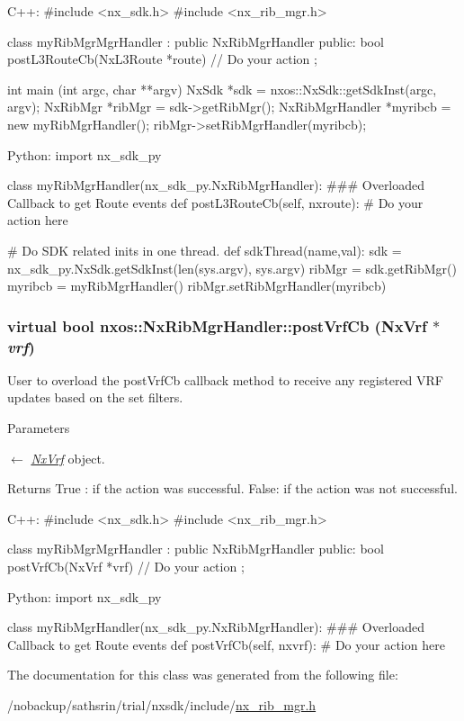 \begin{DoxyCode}
  C++:
     #include <nx_sdk.h>
     #include <nx_rib_mgr.h>

     class myRibMgrMgrHandler : public NxRibMgrHandler {
        public:
           bool postL3RouteCb(NxL3Route *route) {
                // Do your action
           }
     };

     int  main (int argc, char **argv)
     {
          NxSdk    *sdk = nxos::NxSdk::getSdkInst(argc, argv);
          NxRibMgr *ribMgr = sdk->getRibMgr();
          NxRibMgrHandler *myribcb = new myRibMgrHandler();
          ribMgr->setRibMgrHandler(myribcb);
     }

  Python:
     import nx_sdk_py

     class myRibMgrHandler(nx_sdk_py.NxRibMgrHandler):
     ### Overloaded Callback to get Route events
           def postL3RouteCb(self, nxroute):
               # Do your action here

     # Do SDK related inits in one thread.
     def sdkThread(name,val):
         sdk = nx_sdk_py.NxSdk.getSdkInst(len(sys.argv), sys.argv)
         ribMgr = sdk.getRibMgr()
         myribcb = myRibMgrHandler()
         ribMgr.setRibMgrHandler(myribcb)
\end{DoxyCode}
 \hypertarget{classnxos_1_1NxRibMgrHandler_a2ed5a3ad9c0e55d21e18d88a19419a5e}{
\subsubsection[{postVrfCb}]{\setlength{\rightskip}{0pt plus 5cm}virtual bool nxos::NxRibMgrHandler::postVrfCb ({\bf NxVrf} $\ast$ {\em vrf})}}
\label{classnxos_1_1NxRibMgrHandler_a2ed5a3ad9c0e55d21e18d88a19419a5e}
User to overload the postVrfCb callback method to receive any registered VRF updates based on the set filters. 
\begin{DoxyParams}{Parameters}
\item[\mbox{$\leftarrow$} {\em \hyperlink{classnxos_1_1NxVrf}{NxVrf}}]object.\end{DoxyParams}
\begin{DoxyReturn}{Returns}
True : if the action was successful. False: if the action was not successful.
\end{DoxyReturn}

\begin{DoxyCode}
  C++:
     #include <nx_sdk.h>
     #include <nx_rib_mgr.h>

     class myRibMgrMgrHandler : public NxRibMgrHandler {
        public:
           bool postVrfCb(NxVrf *vrf) {
                // Do your action
           }
     };

  Python:
     import nx_sdk_py

     class myRibMgrHandler(nx_sdk_py.NxRibMgrHandler):
     ### Overloaded Callback to get Route events
           def postVrfCb(self, nxvrf):
               # Do your action here
\end{DoxyCode}
 

The documentation for this class was generated from the following file:\begin{DoxyCompactItemize}
\item 
/nobackup/sathsrin/trial/nxsdk/include/\hyperlink{nx__rib__mgr_8h}{nx\_\-rib\_\-mgr.h}\end{DoxyCompactItemize}
